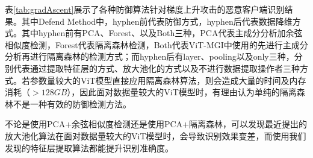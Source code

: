 \documentclass[conference]{IEEEtran}
\begin{document}
\begin{table}[htbp]
    \caption{Grad Ascent Defense Result}
    \begin{center}
    \label{tab:gradAscent}
    \end{center}
\end{table}

表\hyperref[tab:gradAscent]{\ref{tab:gradAscent}}展示了各种防御算法针对梯度上升攻击的恶意客户端识别结果。其中Defend Method中，hyphen前代表防御方式，hyphen后代表数据降维方式。其中hyphen前有PCA、Forest、以及Both三种，PCA代表主成分分析加余弦相似度检测，Forest代表隔离森林检测，Both代表ViT-MGI中使用的先进行主成分分析再进行隔离森林的检测方式；而hyphen后有layer、pooling以及only三种，分别代表通过提取特征层的方式、放大池化的方式以及不进行数据提取操作者三种方式。若参数量较大的ViT模型直接应用隔离森林算法，则会造成大量的时间及内存消耗（$> 128GB$），因此面对数据量较大的ViT模型时，有理由认为单纯的隔离森林不是一种有效的防御检测方法。

不论是使用PCA+余弦相似度检测还是使用PCA+隔离森林，可以发现最近提出的放大池化\cite{betterTogether}算法在面对数据量较大的ViT模型时，会导致识别效果变差，而使用我们发现的特征层提取算法都能提升识别准确度。
\end{document}
